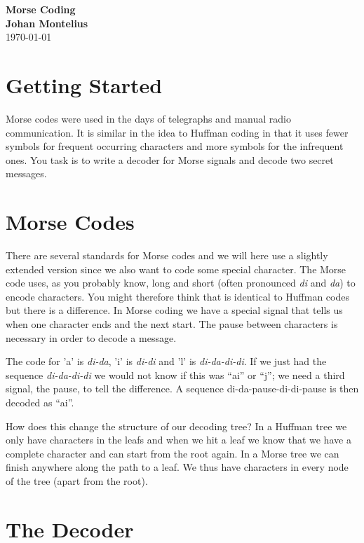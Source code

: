 \documentclass[a4paper,11pt]{article}
\newcommand{\nnsection}[1]{
\section*{#1}
\addcontentsline{toc}{section}{#1}
}
\begin{document}
\begin{center}
\vspace{20pt}
\textbf{\large Morse Coding}\\
\vspace{10pt}
\textbf{Johan Montelius}\\
\vspace{10pt}
\today{}
\end{center}


\nnsection{Getting Started}

Morse codes were used in the days of telegraphs and manual radio
communication. It is similar in the idea to Huffman coding in that it
uses fewer symbols for frequent occurring characters and more symbols
for the infrequent ones. You task is to write a decoder for Morse
signals and decode two secret messages. 

\section{Morse Codes}

There are several standards for Morse codes and we will here use a
slightly extended version since we also want to code some special
character. The Morse code uses, as you probably know, long and short
(often pronounced {\em di} and {\em da}) to encode characters. You
might therefore think that is identical to Huffman codes but there is
a difference. In Morse coding we have a special signal that tells us
when one character ends and the next start. The pause between
characters is necessary in order to decode a message.

The code for 'a' is {\em di-da}, 'i' is {\em di-di} and 'l' is {\em di-da-di-di}.  If
we just had the sequence {\em di-da-di-di} we would not know if this
was ``ai'' or ``j''; we need a third signal, the pause, to tell the
difference. A sequence {di-da-pause-di-di-pause} is then decoded as ``ai''.

How does this change the structure of our decoding tree? In a Huffman
tree we only have characters in the leafs and when we hit a leaf we
know that we have a complete character and can start from the root
again. In a Morse tree we can finish anywhere along the path to a
leaf. We thus have characters in every node of the tree (apart from the
root).

\section{The Decoder}
\end{document}
